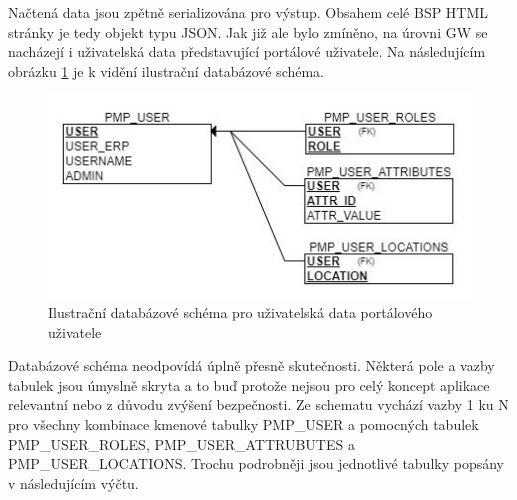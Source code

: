\documentclass[thesis=M,czech]{FITthesis}[2012/06/26]
\begin{document}
Načtená data jsou zpětně serializována pro výstup. Obsahem celé BSP HTML stránky je tedy objekt typu JSON. Jak již ale bylo zmíněno, na úrovni GW se nacházejí i uživatelská data představující portálové uživatele. Na následujícím obrázku \ref{img:gw_db} je k vidění ilustrační databázové schéma. 

\begin{figure}[H]
	\centering
	\includegraphics[]{images/gw_db}
	\caption{Ilustrační databázové schéma pro uživatelská data portálového uživatele}
	\label{img:gw_db}
\end{figure}

Databázové schéma neodpovídá úplně přesně skutečnosti. Některá pole a vazby tabulek jsou úmyslně skryta a to buď protože nejsou pro celý koncept aplikace relevantní nebo z důvodu zvýšení bezpečnosti. Ze schematu vychází vazby 1 ku N pro všechny kombinace kmenové tabulky PMP\_USER a pomocných tabulek PMP\_USER\_ROLES, PMP\_USER\_ATTRUBUTES a PMP\_USER\_LOCATIONS. Trochu podrobněji jsou jednotlivé tabulky popsány v následujícím výčtu.
\end{document}
